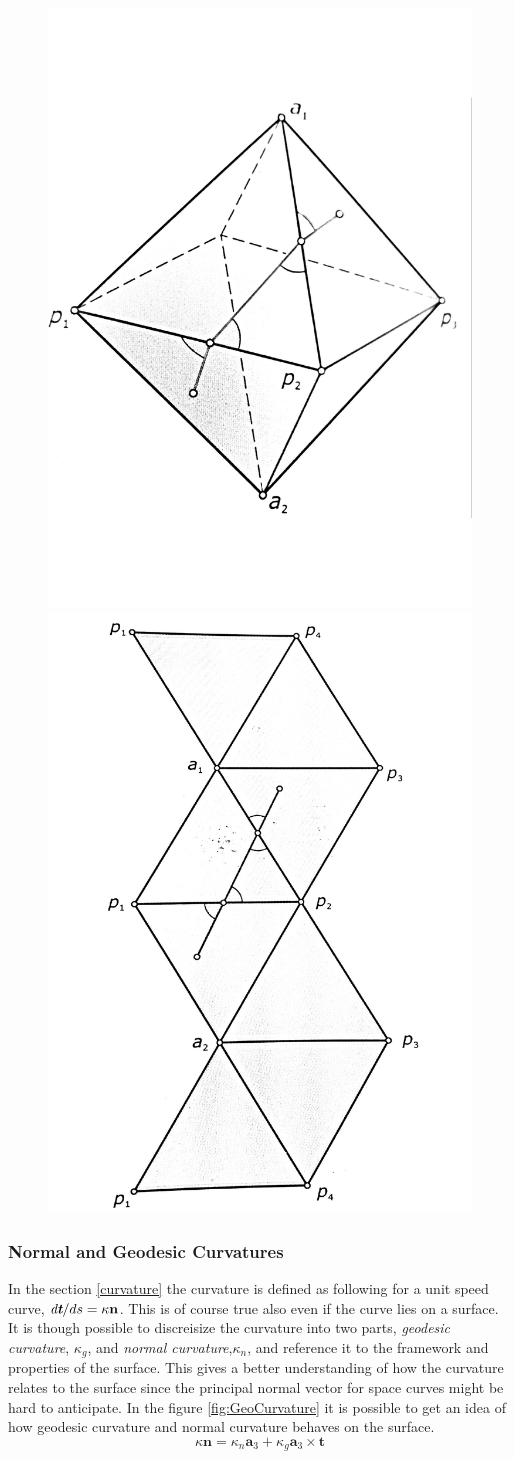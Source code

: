 \begin{figure}[H]
\centering
\includegraphics[width=0.35\linewidth ]{figure/Theory/shortpath.pdf}
\includegraphics[width=0.35\linewidth ]{figure/Theory/shortpath2.pdf}
\caption{\cite{ref:ArchGeometry} }
\end{figure}


\subsubsection{Normal and Geodesic Curvatures}

In the section \ref{curvature} the curvature is defined as following for a unit speed curve,
$\textit{d\textbf{t}}/ds = \kappa \textbf{n}$. This is of course true also even if the curve lies on a surface. It is though possible to discreisize the curvature into two parts, \textit{geodesic curvature}, $\kappa_g$, and \textit{normal curvature},$\kappa_n$, and reference it to the framework and properties of the surface. This gives a better understanding of how the curvature relates to the surface since the principal normal vector for space curves might be hard to anticipate. In the figure \ref{fig:GeoCurvature} it is possible to get an idea of how geodesic curvature and normal curvature behaves on the surface.
\begin{equation}
\kappa \textbf{n} = \kappa_n \textbf{a}_3 + \kappa_g\textbf{a}_3 \times \textbf{t}
\end{equation}

